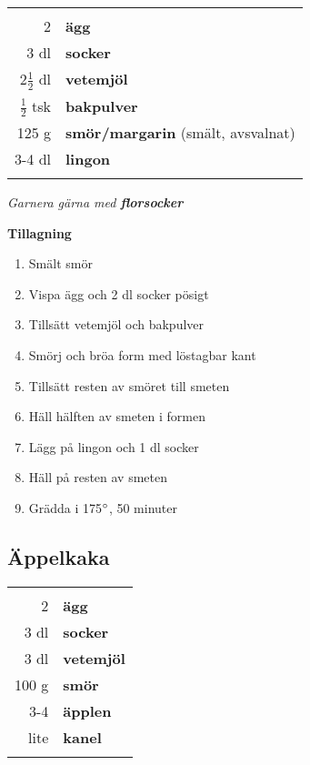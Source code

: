 \documentclass[a4paper,12pt]{article}
\newcommand{\garn}[1]{\noindent \textit{Garnera gärna med \textbf{#1}}}
\begin{document}
\begin{table}[H]
	\begin{tabular}{rl}
	\hline
	&\\
		2 & \textbf{ägg}\\
		3 dl & \textbf{socker}\\
		2$\frac{1}{2}$ dl & \textbf{vetemjöl}\\
		$\frac{1}{2}$ tsk & \textbf{bakpulver}\\
		125 g & \textbf{smör/margarin} (smält, avsvalnat)\\
		3-4 dl & \textbf{lingon}\\
	&\\
	\hline
	\end{tabular}
\end{table}

\garn{florsocker}

\begin{multicols*}{2}

\noindent \textbf{Tillagning}
\begin{enumerate}
	\itemsep0cm
	\item Smält smör
	\item Vispa ägg och 2 dl socker pösigt
	\item Tillsätt vetemjöl och bakpulver
	\item Smörj och bröa form med löstagbar kant
	\item Tillsätt resten av smöret till smeten
	\item Häll hälften av smeten i formen
	\item Lägg på lingon och 1 dl socker
	\item Häll på resten av smeten
	\item Grädda i 175$\degree$, 50 minuter
\end{enumerate}

\end{multicols*}

\clearpage

\subsection{Äppelkaka}

\begin{table}[H]
	\begin{tabular}{rl}
	\hline
	&\\
		2 & \textbf{ägg}\\
		3 dl & \textbf{socker}\\
		3 dl & \textbf{vetemjöl}\\
		100 g & \textbf{smör}\\
		3-4 & \textbf{äpplen}\\
		lite & \textbf{kanel}\\
	&\\
	\hline
	\end{tabular}
\end{table}
\end{document}
